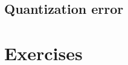 \documentclass[11pt]{article}
\begin{document}
\subsection{Quantization error}


\section{Exercises}








\end{document}
